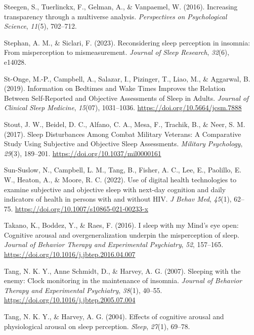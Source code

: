 \documentclass[
]{article}
\newlength{\cslhangindent}
\newenvironment{CSLReferences}[2] %
 {\begin{list}{}{%
  \setlength{\itemindent}{0pt}
  \setlength{\leftmargin}{0pt}
  \setlength{\parsep}{0pt}
  \ifodd #1
   \setlength{\leftmargin}{\cslhangindent}
   \setlength{\itemindent}{-1\cslhangindent}
  \fi
  \setlength{\itemsep}{#2\baselineskip}}}
 {\end{list}}
\begin{document}
\begin{CSLReferences}{1}{0}
Steegen, S., Tuerlinckx, F., Gelman, A., \& Vanpaemel, W. (2016). Increasing transparency through a multiverse analysis. \emph{Perspectives on Psychological Science}, \emph{11}(5), 702--712.

Stephan, A. M., \& Siclari, F. (2023). Reconsidering sleep perception in insomnia: From misperception to mismeasurement. \emph{Journal of Sleep Research}, \emph{32}(6), e14028.

St-Onge, M.-P., Campbell, A., Salazar, I., Pizinger, T., Liao, M., \& Aggarwal, B. (2019). Information on {Bedtimes} and {Wake} {Times} {Improves} the {Relation} {Between} {Self}-{Reported} and {Objective} {Assessments} of {Sleep} in {Adults}. \emph{Journal of Clinical Sleep Medicine}, \emph{15}(07), 1031--1036. \url{https://doi.org/10.5664/jcsm.7888}

Stout, J. W., Beidel, D. C., Alfano, C. A., Mesa, F., Trachik, B., \& Neer, S. M. (2017). Sleep {Disturbances} {Among} {Combat} {Military} {Veterans}: {A} {Comparative} {Study} {Using} {Subjective} and {Objective} {Sleep} {Assessments}. \emph{Military Psychology}, \emph{29}(3), 189--201. \url{https://doi.org/10.1037/mil0000161}

Sun-Suslow, N., Campbell, L. M., Tang, B., Fisher, A. C., Lee, E., Paolillo, E. W., Heaton, A., \& Moore, R. C. (2022). Use of digital health technologies to examine subjective and objective sleep with next-day cognition and daily indicators of health in persons with and without {HIV}. \emph{J Behav Med}, \emph{45}(1), 62--75. \url{https://doi.org/10.1007/s10865-021-00233-x}

Takano, K., Boddez, Y., \& Raes, F. (2016). I sleep with my {Mind}'s eye open: {Cognitive} arousal and overgeneralization underpin the misperception of sleep. \emph{Journal of Behavior Therapy and Experimental Psychiatry}, \emph{52}, 157--165. \url{https://doi.org/10.1016/j.jbtep.2016.04.007}

Tang, N. K. Y., Anne Schmidt, D., \& Harvey, A. G. (2007). Sleeping with the enemy: {Clock} monitoring in the maintenance of insomnia. \emph{Journal of Behavior Therapy and Experimental Psychiatry}, \emph{38}(1), 40--55. \url{https://doi.org/10.1016/j.jbtep.2005.07.004}

Tang, N. K. Y., \& Harvey, A. G. (2004). Effects of cognitive arousal and physiological arousal on sleep perception. \emph{Sleep}, \emph{27}(1), 69--78.


\end{CSLReferences}
\end{document}

